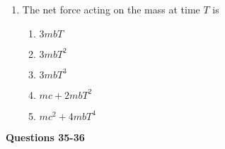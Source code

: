 \documentclass{../../oss-apphys}
\begin{document}
\begin{multicols}{2}
\begin{enumerate}[resume,leftmargin=18pt]
  \item The net force acting on the mass at time $T$ is
    \begin{enumerate}[noitemsep,topsep=0pt,leftmargin=18pt,label=(\Alph*)]
    \item $3mbT$
    \item $3mbT^2$
    \item $3mbT^3$
    \item $mc+2mbT^2$
    \item $mc^2+4mbT^4$
    \end{enumerate}


  \end{enumerate}
  
  \textbf{Questions 35-36}


\end{multicols}
\end{document}
